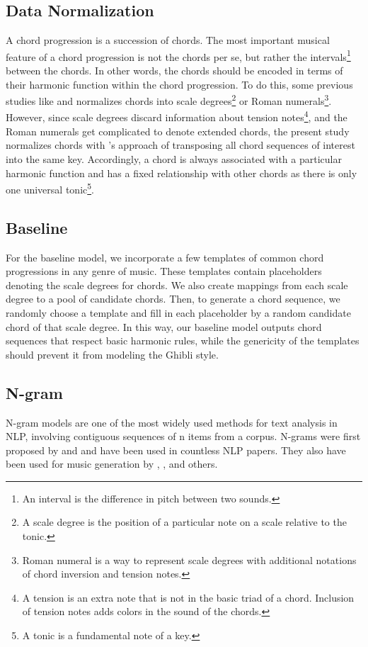 \documentclass[11pt,a4paper]{article}
\begin{document}
\subsection{Data Normalization}
A chord progression is a succession of chords. The most important musical feature of a chord progression is not the chords per se, but rather the intervals\footnote{An interval is the difference in pitch between two sounds.} between the chords. In other words, the chords should be encoded in terms of their harmonic function within the chord progression. To do this, some previous studies like \citet{whorley2007} and \citet{shukla2018} normalizes chords into scale degrees\footnote{A scale degree is the position of a particular note on a scale relative to the tonic.} or Roman numerals\footnote{Roman numeral is a way to represent scale degrees with additional notations of chord inversion and tension notes.}. However, since scale degrees discard information about tension notes\footnote{A tension is an extra note that is not in the basic triad of a chord. Inclusion of tension notes adds colors in the sound of the chords.}, and the Roman numerals get complicated to denote extended chords, the present study normalizes chords with \citet{ogihara2008}’s approach of transposing all chord sequences of interest into the same key. Accordingly, a chord is always associated with a particular harmonic function and has a fixed relationship with other chords as there is only one universal tonic\footnote{A tonic is a fundamental note of a key.}. 

\subsection{Baseline} 
For the baseline model, we incorporate a few templates of common chord progressions in any genre of music. These templates contain placeholders denoting the scale degrees for chords. We also create mappings from each scale degree to a pool of candidate chords. Then, to generate a chord sequence, we randomly choose a template and fill in each placeholder by a random candidate chord of that scale degree. In this way, our baseline model outputs chord sequences that respect basic harmonic rules, while the genericity of the templates should prevent it from modeling the Ghibli style.

\subsection{N-gram}
N-gram models are one of the most widely used methods for text analysis in NLP, involving contiguous sequences of n items from a corpus. N-grams were first proposed by \citet{shannon1951} and \citet{miller1950} and have been used in countless NLP papers. They also have been used for music generation by \citet{ponsford1999}, \citet{ogihara2008}, and others. 
\end{document}
